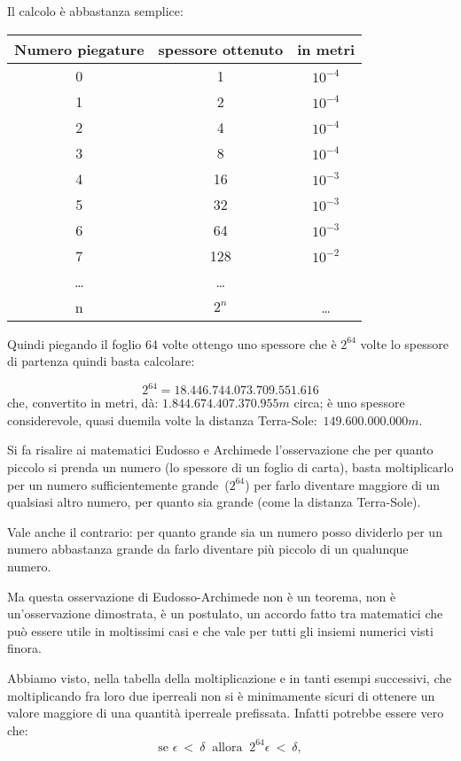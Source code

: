 Il calcolo è abbastanza semplice:

\begin{center}
 \begin{tabular}{ccc}
\toprule
Numero piegature & spessore ottenuto & in metri\\
\midrule
0 & 1 & $10^{-4}$\\
1 & 2 & $10^{-4}$\\
2 & 4 & $10^{-4}$\\
3 & 8 & $10^{-4}$\\
4 & 16 & $10^{-3}$\\
5 & 32 & $10^{-3}$\\
6 & 64 & $10^{-3}$\\
7 & 128 & $10^{-2}$\\
\ldots& \ldots\\
n & $2^n$ & \ldots\\
\bottomrule
\end{tabular}
\end{center}

Quindi piegando il foglio 64 volte ottengo uno spessore che è $2^{64}$ volte lo 
spessore di partenza quindi basta calcolare:

\[2^{64} = 18.446.744.073.709.551.616\]
che, convertito in metri, dà: $1.844.674.407.370.955m$ circa; è uno spessore 
considerevole, quasi duemila volte la distanza Terra-Sole:~$149.600.000.000m$.

Si fa risalire ai matematici Eudosso e Archimede l'osservazione che per quanto 
piccolo si prenda un numero (lo spessore di un foglio di carta), basta 
moltiplicarlo per un numero sufficientemente grande~($2^{64}$) per farlo 
diventare maggiore di un qualsiasi altro numero, per quanto sia grande 
(come la distanza Terra-Sole).

Vale anche il contrario: per quanto grande sia un numero posso dividerlo per un 
numero abbastanza grande da farlo diventare più piccolo di un qualunque numero.

Ma questa osservazione di Eudosso-Archimede non è un teorema, non è 
un'osservazione dimostrata, è un postulato, un accordo fatto tra matematici che 
può essere utile in moltissimi casi e che vale per tutti gli insiemi numerici 
visti finora. 

Abbiamo visto, nella tabella della moltiplicazione e in tanti esempi successivi, che 
moltiplicando fra loro due iperreali non si è minimamente sicuri di ottenere un
valore maggiore di una quantità iperreale prefissata. Infatti potrebbe essere vero che:
\[
 \text{se }\epsilon \  < \ \delta\ \text{  allora  }\ 2^{64}\epsilon\ <\ \delta,
\]


